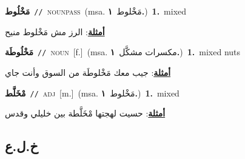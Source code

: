 \documentclass[10pt,a4paper,twoside]{article} %
\begin{document}
\begin{multicols}{2}
{\setlength\topsep{0pt}\textbf{\foreignlanguage{arabic}{مَخْلُوط}}\ {\color{gray}\texttt{//}\color{black}}\ \textsc{noun\textunderscore pass}\ \color{gray}(msa. \foreignlanguage{arabic}{مَخْلوط}~\foreignlanguage{arabic}{\textbf{١.}})\color{black}\ \textbf{1.}~mixed\  \begin{flushright}\color{gray}\foreignlanguage{arabic}{\textbf{\underline{\foreignlanguage{arabic}{أمثلة}}}: الرز مش مَخْلوط منيح}\end{flushright}\color{black}} \vspace{2mm}

{\setlength\topsep{0pt}\textbf{\foreignlanguage{arabic}{مَخْلُوطَة}}\ {\color{gray}\texttt{//}\color{black}}\ \textsc{noun}\ [f.]\ \color{gray}(msa. \foreignlanguage{arabic}{مكسرات مشكَّل}~\foreignlanguage{arabic}{\textbf{١.}})\color{black}\ \textbf{1.}~mixed nuts\  \begin{flushright}\color{gray}\foreignlanguage{arabic}{\textbf{\underline{\foreignlanguage{arabic}{أمثلة}}}: جيب معك مَخْلوطَة من السوق وأنت جاي}\end{flushright}\color{black}} \vspace{2mm}

{\setlength\topsep{0pt}\textbf{\foreignlanguage{arabic}{مْخَلَّط}}\ {\color{gray}\texttt{//}\color{black}}\ \textsc{adj}\ [m.]\ \color{gray}(msa. \foreignlanguage{arabic}{مَخْلوط}~\foreignlanguage{arabic}{\textbf{١.}})\color{black}\ \textbf{1.}~mixed\  \begin{flushright}\color{gray}\foreignlanguage{arabic}{\textbf{\underline{\foreignlanguage{arabic}{أمثلة}}}: حسيت لهجتها مْخَلَّطة بين خليلي وقدس}\end{flushright}\color{black}} \vspace{2mm}

\vspace{-3mm}
\subsection*{\color{blue}\foreignlanguage{arabic}{خ.ل.ع}\color{blue}{}} 


\end{multicols}
\end{document}
